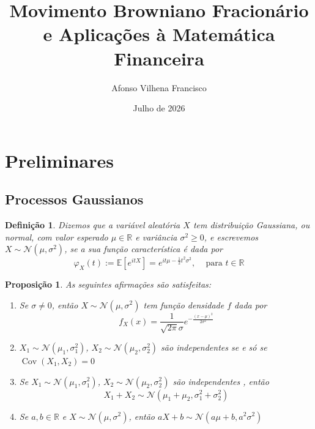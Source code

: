 \documentclass{article}
\title{Movimento Browniano Fracionário e Aplicações à Matemática Financeira}
\author{Afonso Vilhena Francisco }
\date{Julho de 2026}
\begin{document}
\newtheorem{dfn}{Definição}[section]
\newtheorem{prop}{Proposição}[section]
\newtheorem{thm}{Teorema}[section]
\newtheorem{cor}{Corolário}[section]
\newtheorem{lema}{Lema}[section]

\renewcommand{\proofname}{Demonstração}

\maketitle
\setcounter{section}{-1}

\section{Preliminares}

\subsection{Processos Gaussianos}


\begin{dfn}
Dizemos que a variável aleatória $X$ tem distribuição Gaussiana, ou normal, com valor esperado $\mu \in \mathbb{R}$ e variância $\sigma^2 \geq 0$, e escrevemos $X \sim \mathcal{N}(\mu, \sigma^2)$, se a sua função característica é dada por 
$$\varphi_X(t):=\mathbb{E}[e^{itX}]=e^{it\mu-\frac{1}{2}t^2\sigma^2},\;\;\; \text{ para } t\in \mathbb{R}$$
\end{dfn}

\vspace{0.2cm}

\begin{prop}
As seguintes afirmações são satisfeitas:
\begin{enumerate}[label=\roman*), align=left]

    
    \item Se $\sigma \neq 0$, então $X \sim \mathcal{N}(\mu,\sigma^2)$ tem função densidade $f$ dada por
    $$f_X(x)=\frac{1}{\sqrt{2\pi}\sigma}e^{-{\frac{(x-\mu)^2}{2\sigma^2}}}$$

    \item $X_1 \sim \mathcal{N}(\mu_1,\sigma_1^2)$, $X_2 \sim \mathcal{N}(\mu_2,\sigma_2^2)$ são independentes se e só se $\operatorname{Cov}(X_1,X_2)=0$
    
    \item Se $X_1 \sim \mathcal{N}(\mu_1,\sigma_1^2)$, $X_2 \sim \mathcal{N}(\mu_2,\sigma_2^2)$ são independentes , então
    $$X_1+X_2 \sim \mathcal{N}(\mu_1+\mu_2, \sigma_1^2+\sigma_2^2)$$

    \item Se $a,b\in \mathbb{R}$ e $X \sim \mathcal{N}(\mu, \sigma^2)$, então $aX+b \sim \mathcal{N}(a\mu+b, a^2\sigma^2)$

\end{enumerate}    
\end{prop}
\end{document}
